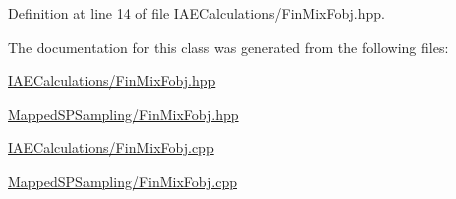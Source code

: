 \-Definition at line 14 of file \-I\-A\-E\-Calculations/\-Fin\-Mix\-Fobj.\-hpp.



\-The documentation for this class was generated from the following files\-:\begin{DoxyCompactItemize}
\item 
\hyperlink{IAECalculations_2FinMixFobj_8hpp}{\-I\-A\-E\-Calculations/\-Fin\-Mix\-Fobj.\-hpp}\item 
\hyperlink{MappedSPSampling_2FinMixFobj_8hpp}{\-Mapped\-S\-P\-Sampling/\-Fin\-Mix\-Fobj.\-hpp}\item 
\hyperlink{IAECalculations_2FinMixFobj_8cpp}{\-I\-A\-E\-Calculations/\-Fin\-Mix\-Fobj.\-cpp}\item 
\hyperlink{MappedSPSampling_2FinMixFobj_8cpp}{\-Mapped\-S\-P\-Sampling/\-Fin\-Mix\-Fobj.\-cpp}\end{DoxyCompactItemize}

